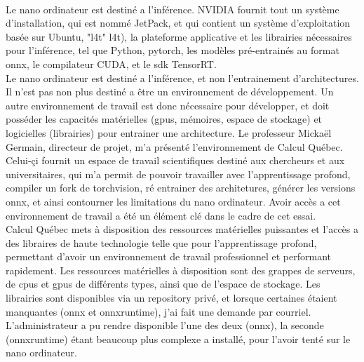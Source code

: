 ﻿
\vspace{\baselineskip}
\\
\noindent Le nano ordinateur est destiné a l'inférence. NVIDIA fournit tout un système d'installation, qui est nommé JetPack, et qui contient un système d'exploitation basée sur Ubuntu, "\acrlong{l4t}" \acrshort{l4t}), la plateforme applicative et les librairies nécessaires pour l'inférence, tel que Python, pytorch, les modèles pré-entrainés au format \acrshort{onnx}, le compilateur CUDA, et le \acrshort{sdk} TensorRT.
\vspace{\baselineskip}
\\
\noindent Le nano ordinateur est destiné a l'inférence, et non l'entrainement d'architectures. Il n'est pas non plus destiné a être un environnement de développement. Un autre environnement de travail est donc nécessaire pour développer, et doit posséder les capacités matérielles (\acrshort{gpu}s, mémoires, espace de stockage) et logicielles (librairies) pour entrainer une architecture. Le professeur Mickaël Germain, directeur de projet, m'a présenté l'environnement de Calcul Québec. Celui-çi fournit un espace de travail scientifiques destiné aux chercheurs et aux universitaires, qui m'a permit  de pouvoir travailler avec l'apprentissage profond, compiler un fork de torchvision, ré entrainer des architetures, générer les versions \acrshort{onnx}, et ainsi contourner les limitations du nano ordinateur. Avoir accès a cet environnement de travail a été un élément clé dans le cadre de cet essai.
\vspace{\baselineskip}
\\
\noindent Calcul Québec mets à disposition des ressources matérielles puissantes et l'accès a des libraires de haute technologie telle que pour l'apprentissage profond, permettant d'avoir un environnement de travail professionnel et performant rapidement. Les ressources matérielles à disposition sont des grappes de serveurs, de \acrshort{cpu}s et \acrshort{gpu}s de différents types, ainsi que de l'espace de stockage. Les librairies sont disponibles via un repository privé, et lorsque certaines étaient manquantes (\acrshort{onnx} et onnxruntime), j'ai fait une demande par courriel. L'administrateur a pu rendre disponible l'une des deux (\acrshort{onnx}), la seconde (onnxruntime) étant beaucoup plus complexe a installé, pour l'avoir tenté sur le nano ordinateur. 
\vspace{\baselineskip}
\\

